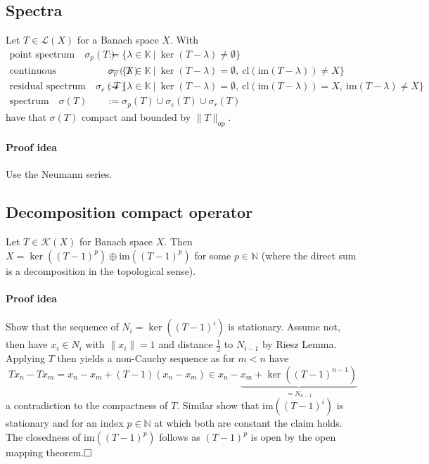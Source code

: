 \documentclass{scrartcl}
\newcommand{\N}{\mathbb{N}}
\begin{document}
\subsection{Spectra}
Let $T \in \mathcal{L}(X)$ for a Banach space $X$.
With
\begin{align*}
    \text{point spectrum} \quad \sigma_p(T) &:= \{ \lambda \in \mathbb{K} \ | \ \ker(T - \lambda) \neq \emptyset \} \\
    \text{continuous spectrum} \quad \sigma_c(T) &:= \{ \lambda \in \mathbb{K} \ | \ \ker(T - \lambda) = \emptyset, \ \mathrm{cl}(\mathrm{im}(T - \lambda)) \neq X \} \\
    \text{residual spectrum} \quad \sigma_r(T) &:= \{ \lambda \in \mathbb{K} \ | \ \ker(T - \lambda) = \emptyset, \ \mathrm{cl}(\mathrm{im}(T - \lambda)) = X, \ \mathrm{im}(T - \lambda) \neq X \} \\
    \text{spectrum} \quad \sigma(T) &:= \sigma_p(T) \cup \sigma_c(T) \cup \sigma_r(T)
\end{align*}
have that $\sigma(T)$ compact and bounded by $\| T \|_{\mathrm{op}}$.
\paragraph{Proof idea} Use the Neumann series.

\subsection{Decomposition compact operator}
\label{decomposition_compact_operator}
Let $T \in \mathcal{K}(X)$ for Banach space $X$. Then $X = \ker((T - 1)^p) \oplus \mathrm{im}((T - 1)^p)$ for some $p \in \N$ (where the direct sum is a decomposition in the topological sense).
\paragraph{Proof idea} Show that the sequence of $N_i = \ker((T - 1)^i)$ is stationary. Assume not, then have $x_i \in N_i$ with $\|x_i\| = 1$ and distance $\frac 1 2$ to $N_{i - 1}$ by Riesz Lemma. Applying $T$ then yields a non-Cauchy sequence as for $m < n$ have
\begin{equation*}
    Tx_n - Tx_m = x_n - x_m + (T - 1)(x_n - x_m) \in x_n - \underbrace{x_m + \ker((T - 1)^{n - 1})}_{= N_{n - 1}}
\end{equation*}
a contradiction to the compactness of $T$. Similar show that $\mathrm{im}((T - 1)^i)$ is stationary and for an index $p \in \N$ at which both are constant the claim holds. The closedness of $\mathrm{im}((T - 1)^p)$ follows as $(T - 1)^p$ is open by the open mapping theorem.$\hfill\square$
\end{document}
